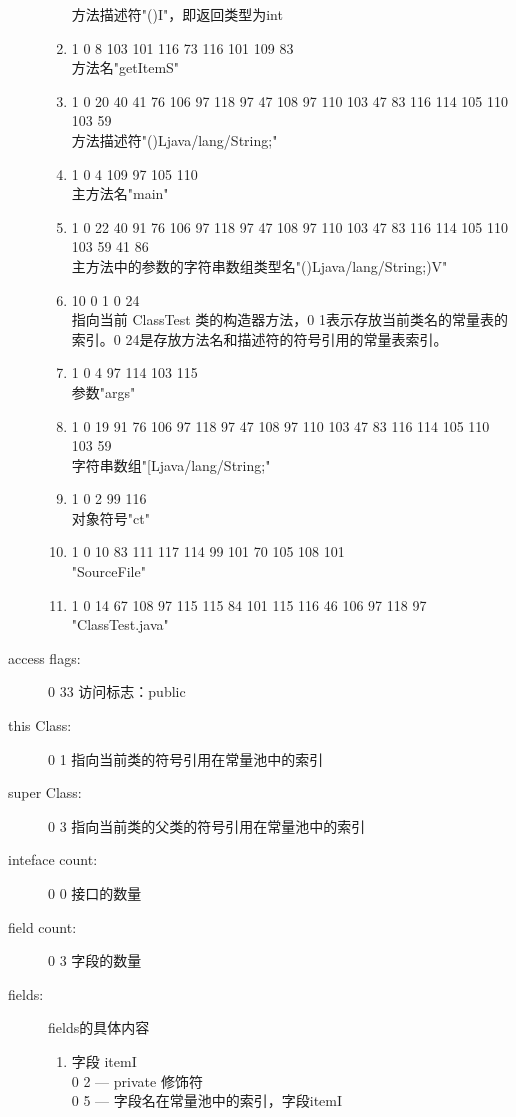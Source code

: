 \begin{description}
\begin{enumerate}
		方法描述符"()I"，即返回类型为int
	\item 1 0 8 103 101 116 73 116 101 109 83\\
		方法名"getItemS"
	\item 1 0 20 40 41 76 106 97 118 97 47 108 97 110 103 47 83 116 114 105 110 103 59\\
		方法描述符"()Ljava/lang/String;"
	\item 1 0 4 109 97 105 110\\
		主方法名"main"
	\item 1 0 22 40 91 76 106 97 118 97 47 108 97 110 103 47 83 116 114 105 110 103 59 41 86\\
		主方法中的参数的字符串数组类型名"()Ljava/lang/String;)V"
	\item 10 0 1 0 24\\
		指向当前 ClassTest 类的构造器方法，0 1表示存放当前类名的常量表的索引。0 24是存放方法名和描述符的符号引用的常量表索引。
	\item 1 0 4 97 114 103 115\\
		参数"args"
	\item 1 0 19 91 76 106 97 118 97 47 108 97 110 103 47 83 116 114 105 110 103 59\\
		字符串数组"[Ljava/lang/String;"
	\item 1 0 2 99 116\\
		对象符号"ct"
	\item 1 0 10 83 111 117 114 99 101 70 105 108 101\\
		"SourceFile"
	\item 1 0 14 67 108 97 115 115 84 101 115 116 46 106 97 118 97\\
		"ClassTest.java"
	\end{enumerate}
\item [access flags:] 0 33 访问标志：public
\item [this Class:] 0 1 指向当前类的符号引用在常量池中的索引
\item [super Class:] 0 3 指向当前类的父类的符号引用在常量池中的索引
\item [inteface count:] 0 0 接口的数量
\item [field count:] 0 3 字段的数量
\item [fields:] fields的具体内容
	\begin{enumerate}
	\item 字段 itemI\\
		0 2  --- private 修饰符\\
		0 5  --- 字段名在常量池中的索引，字段itemI\\

\end{enumerate}
\end{description}
